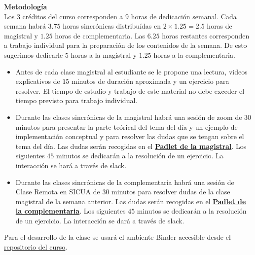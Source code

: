 \documentclass[letterpaper,10pt,onecolumn]{article}
\begin{document}
\vspace*{0.5cm} 
\noindent\textbf{\large {} \quad
  Metodolog\'ia}\\[-0.2cm] 

Los $3$ cr\'editos del curso corresponden a $9$ horas de dedicaci\'on semanal.
Cada semana habr\'a $3.75$ horas sincr\'onicas distribu\'idas en $2\times 1.25=2.5$ horas de magistral 
y $1.25$ horas de complementaria. 
Las $6.25$ horas restantes corresponden a trabajo individual para la
preparaci\'on de los contenidos de la semana.
De esto sugerimos dedicarle $5$ horas a la magistral y $1.25$ horas a
la complementaria.

\begin{itemize}
    \item Antes de cada clase magistral al estudiante se le propone
      una lectura, videos explicativos de $15$ minutos de duraci\'on
      aproximada y un ejercicio para resolver. 
      El tiempo de estudio y trabajo de este material no debe exceder
      el tiempo previsto para trabajo individual. 
    \item Durante las clases sincr\'onicas de la magistral habr\'a una
      sesi\'on de zoom de $30$ minutos para presentar la parte
      te\'orical del tema del d\'ia y un ejemplo de implementaci\'on
      conceptual y para resolver las dudas que se tengan sobre el tema
      del d\'ia.
      Las dudas ser\'an recogidas en el 
      \textbf{\href{https://uniandes.padlet.org/jeforero/dddxuuqa7q4cadgs}{Padlet
        de la magistral}}.
      Los siguientes $45$ minutos se dedicar\'an a la resoluci\'on de
      un ejercicio. La interacci\'on se har\'a a trav\'es de slack.
    \item
      Durante las clases sincr\'onicas de la complementaria habr\'a
      una sesi\'on de Clase Remota en SICUA de
      $30$ minutos para resolver dudas de la clase magistral de la
      semana anterior.
      Las dudas ser\'an recogidas en el
      \textbf{\href{https://uniandes.padlet.org/jfsuarez/vj0aroqbr0kw9fmq}{Padlet
        de la complementaria}}.
      Los siguientes $45$ minutos se dedicar\'an a la resoluci\'on de
      un ejercicio. La interacci\'on se dar\'a a trav\'es de slack. 
\end{itemize}

Para el desarrollo de la clase se usará el ambiente Binder accesible
desde el
\href{https://github.com/ComputoCienciasUniandes/MetComp1_202020}{repositorio
  del curso}. 

\end{document}
